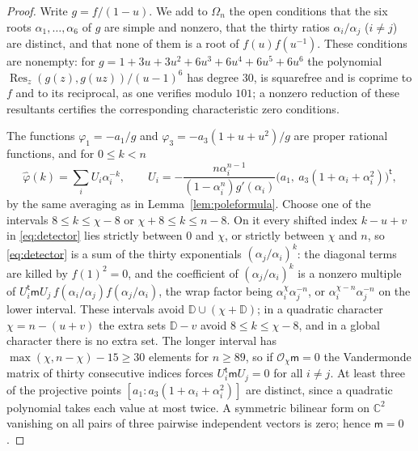 \documentclass{amsart}
\theoremstyle{definition}
\theoremstyle{remark}
\numberwithin{equation}{section}
\newcommand{\CC}{\mathbb{C}}
\begin{document}
\begin{proof}
Write $g=f/(1-u)$. We add to $\Omega_n$ the open conditions that the six roots
$\alpha_1,\dots,\alpha_6$ of $g$ are simple and nonzero, that the thirty ratios
$\alpha_i/\alpha_j$ ($i\ne j$) are distinct, and that none of them is a root of
$f(u)f(u^{-1})$. These conditions are nonempty: for $g=1+3u+3u^2+6u^3+6u^4+6u^5+6u^6$
the polynomial $\operatorname{Res}_z(g(z),g(uz))/(u-1)^6$ has degree $30$, is
squarefree and is coprime to $f$ and to its reciprocal, as one verifies modulo $101$;
a nonzero reduction of these resultants certifies the corresponding characteristic
zero conditions.

The functions $\varphi_1=-a_1/g$ and $\varphi_3=-a_3(1+u+u^2)/g$ are proper rational
functions, and for $0\le k<n$
\[
  \hat\varphi(k)=\sum_iU_i\alpha_i^{-k},\qquad
  U_i=-\frac{n\alpha_i^{n-1}}{(1-\alpha_i^n)g'(\alpha_i)}
   \bigl(a_1,\ a_3(1+\alpha_i+\alpha_i^2)\bigr)^{\mathsf t},
\]
by the same averaging as in Lemma~\ref{lem:poleformula}. Choose one of the intervals
$8\le k\le\chi-8$ or $\chi+8\le k\le n-8$. On it every shifted index $k-u+v$ in
\eqref{eq:detector} lies strictly between $0$ and $\chi$, or strictly between $\chi$ and
$n$, so \eqref{eq:detector} is a sum of the thirty exponentials
$(\alpha_j/\alpha_i)^k$: the diagonal terms are killed by $f(1)^2=0$, and the
coefficient of $(\alpha_j/\alpha_i)^k$ is a nonzero multiple of
$U_i^{\mathsf t}\mathsf mU_j\,f(\alpha_i/\alpha_j)f(\alpha_j/\alpha_i)$, the wrap
factor being $\alpha_i^\chi\alpha_j^{-n}$, or $\alpha_i^{\chi-n}\alpha_j^{-n}$ on the
lower interval. These intervals avoid $\mathbb D\cup(\chi+\mathbb D)$; in a quadratic
character $\chi=n-(u+v)$ the extra sets $\mathbb D-v$ avoid $8\le k\le\chi-8$, and in a
global character there is no extra set. The longer interval has
$\max(\chi,n-\chi)-15\ge30$ elements for $n\ge89$, so if $\mathcal O_\chi\mathsf m=0$ the
Vandermonde matrix of thirty consecutive indices forces
$U_i^{\mathsf t}\mathsf mU_j=0$ for all $i\ne j$. At least three of the projective
points $[a_1:a_3(1+\alpha_i+\alpha_i^2)]$ are distinct, since a quadratic polynomial
takes each value at most twice. A symmetric bilinear form on $\CC^2$ vanishing on
all pairs of three pairwise independent vectors is zero; hence $\mathsf m=0$.
\end{proof}
\end{document}
